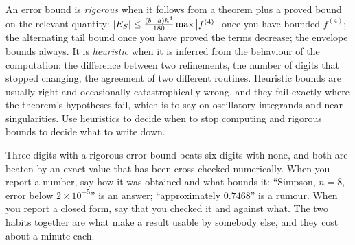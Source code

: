 \begin{keynote}
An error bound is \emph{rigorous} when it follows from a theorem plus a proved bound on the relevant quantity: $\left\lvert E_{S}\right\rvert\leq\tfrac{(b-a)h^{4}}{180}\max\left\lvert f^{(4)}\right\rvert$ once you have bounded $f^{(4)}$; the alternating tail bound once you have proved the terms decrease; the envelope bounds always. It is \emph{heuristic} when it is inferred from the behaviour of the computation: the difference between two refinements, the number of digits that stopped changing, the agreement of two different routines. Heuristic bounds are usually right and occasionally catastrophically wrong, and they fail exactly where the theorem's hypotheses fail, which is to say on oscillatory integrands and near singularities. Use heuristics to decide when to stop computing and rigorous bounds to decide what to write down.
\end{keynote}

\begin{keynote}
Three digits with a rigorous error bound beats six digits with none, and both are beaten by an exact value that has been cross-checked numerically. When you report a number, say how it was obtained and what bounds it: ``Simpson, $n=8$, error below $2\times10^{-5}$'' is an answer; ``approximately $0.7468$'' is a rumour. When you report a closed form, say that you checked it and against what. The two habits together are what make a result usable by somebody else, and they cost about a minute each.
\end{keynote}

